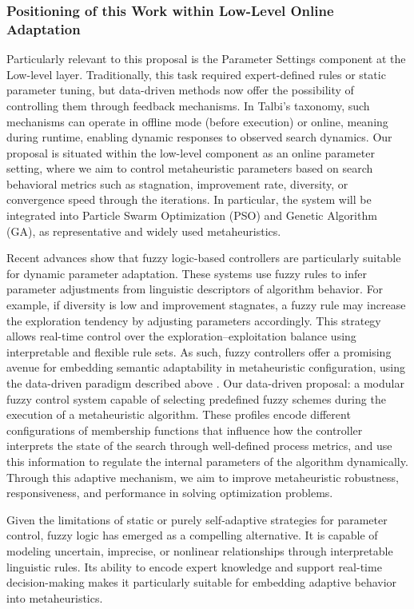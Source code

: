 \subsubsection{Positioning of this Work within Low-Level Online Adaptation}
Particularly relevant to this proposal is the Parameter Settings component at the Low-level layer. Traditionally, this task required expert-defined rules or static parameter tuning, but data-driven methods now offer the possibility of controlling them through feedback mechanisms. In Talbi’s taxonomy, such mechanisms can operate in offline mode (before execution) or online, meaning during runtime, enabling dynamic responses to observed search dynamics. Our proposal is situated within the low-level component as an online parameter setting, where we aim to control metaheuristic parameters based on search behavioral metrics such as stagnation, improvement rate, diversity, or convergence speed through the iterations. In particular, the system will be integrated into Particle Swarm Optimization (PSO) and Genetic Algorithm (GA), as representative and widely used metaheuristics.

Recent advances show that fuzzy logic-based controllers are particularly suitable for dynamic parameter adaptation. These systems use fuzzy rules to infer parameter adjustments from linguistic descriptors of algorithm behavior. For example, if diversity is low and improvement stagnates, a fuzzy rule may increase the exploration tendency by adjusting parameters accordingly. This strategy allows real-time control over the exploration–exploitation balance using interpretable and flexible rule sets. As such, fuzzy controllers offer a promising avenue for embedding semantic adaptability in metaheuristic configuration, using the data-driven paradigm described above \parencite{eftimov2020dsctool}.
Our data-driven proposal: a modular fuzzy control system capable of selecting predefined fuzzy schemes during the execution of a metaheuristic algorithm. These profiles encode different configurations of membership functions that influence how the controller interprets the state of the search through well-defined process metrics, and use this information to regulate the internal parameters of the algorithm dynamically. Through this adaptive mechanism, we aim to improve metaheuristic robustness, responsiveness, and performance in solving optimization problems.

Given the limitations of static or purely self-adaptive strategies for parameter control, fuzzy logic has emerged as a compelling alternative. It is capable of modeling uncertain, imprecise, or nonlinear relationships through interpretable linguistic rules. Its ability to encode expert knowledge and support real-time decision-making makes it particularly suitable for embedding adaptive behavior into metaheuristics. 

